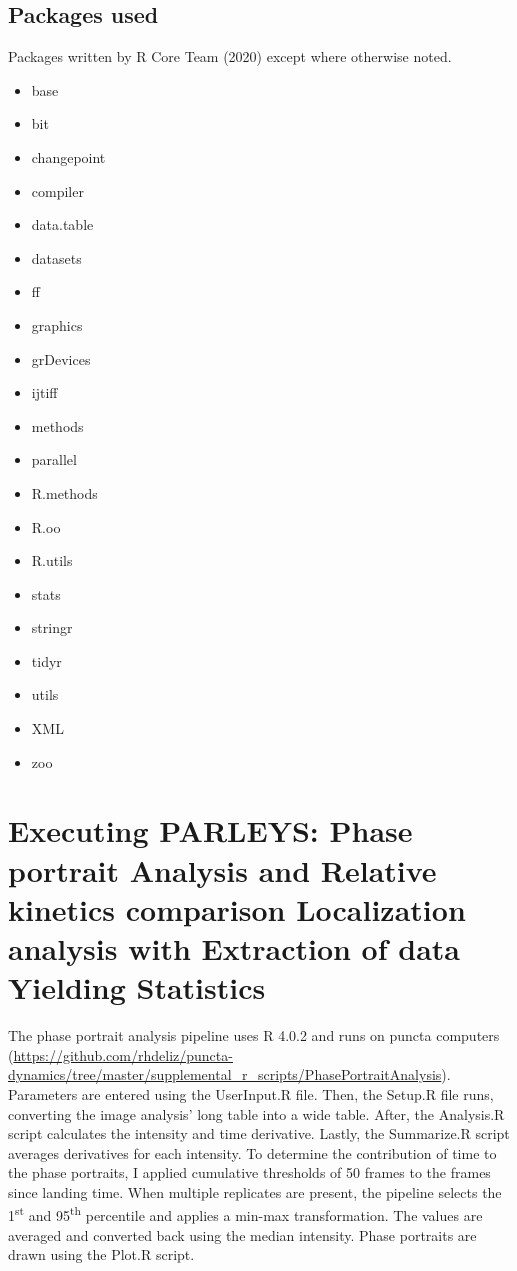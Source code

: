 \subsection{Packages used}
Packages written by R Core Team (2020) except where otherwise noted.
\begin{itemize}
\item base
\item bit \autocite{Oehlschlägel_2020}
\item changepoint \autocite{Killick_2014}
\item compiler
\item data.table \autocite{Dowle_2021}
\item datasets
\item ff \autocite{Adler_2021}
\item graphics
\item grDevices
\item ijtiff \autocite{Nolan_2018}
\item methods
\item parallel
\item R.methods
\item R.oo \autocite{Bengtsson_2003}
\item R.utils \autocite{Bengtsson_2021}
\item stats
\item stringr \autocite{Wickham_2019}
\item tidyr \autocite{Wickham_Tidyr} \\
\item utils
\item XML \autocite{TempleLang_2021}
\item zoo \autocite{Zeileis_2005}
\end{itemize}

\section{Executing PARLEYS: Phase portrait Analysis and Relative kinetics comparison Localization analysis with Extraction of data Yielding Statistics}
\label{section:PARLEYS}
The phase portrait analysis pipeline uses R 4.0.2 and runs on puncta computers (\url{https://github.com/rhdeliz/puncta-dynamics/tree/master/supplemental\_r\_scripts/PhasePortraitAnalysis}). Parameters are entered using the UserInput.R file. Then, the Setup.R file runs, converting the image analysis’ long table into a wide table. After, the Analysis.R script calculates the intensity and time derivative. Lastly, the Summarize.R script averages derivatives for each intensity. To determine the contribution of time to the phase portraits, I applied cumulative thresholds of 50 frames to the frames since landing time. When multiple replicates are present, the pipeline selects the 1\textsuperscript{st} and 95\textsuperscript{th} percentile and applies a min-max transformation. The values are averaged and converted back using the median intensity. Phase portraits are drawn using the Plot.R script.

